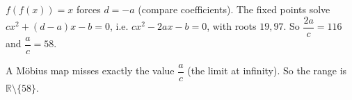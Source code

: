 $f(f(x))=x$ forces $d=-a$ (compare coefficients). The fixed points solve $cx^2+(d-a)x-b=0$, i.e. $cx^2-2ax-b=0$, with roots $19,97$. So $\dfrac{2a}c=116$ and $\dfrac ac=58$.

A M\"obius map misses exactly the value $\dfrac ac$ (the limit at infinity). So the range is $\boxed{\mathbb R\setminus\{58\}}$.
